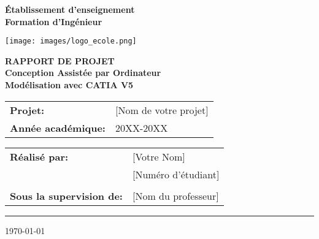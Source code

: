 
\begin{titlepage}
    \begin{center}
        \vspace*{1cm}
        
        \textbf{\LARGE{Établissement d'enseignement}} \\
        \vspace{0.5cm}
        \textbf{\Large{Formation d'Ingénieur}}
        
        \vspace{2cm}
        
        \texttt{[image: images/logo\_ecole.png]} %
        
        \vspace{2cm}
        
        \textbf{\Huge{RAPPORT DE PROJET}}\\
        \vspace{0.5cm}
        \textbf{\LARGE{Conception Assistée par Ordinateur}}\\
        \vspace{1cm}
        \textbf{\huge{Modélisation avec CATIA V5}}
        
        \vspace{1.5cm}
        
        \begin{tabular}{l l}
            \textbf{Projet:} & [Nom de votre projet] \\
            \textbf{Année académique:} & 20XX-20XX \\
        \end{tabular}
        
        \vfill
        
        \begin{tabular}{l l}
            \textbf{Réalisé par:} & [Votre Nom] \\
            & [Numéro d'étudiant] \\
            \\
            \textbf{Sous la supervision de:} & [Nom du professeur] \\
        \end{tabular}
        
        \vspace{1cm}
        
        \begin{center}
            \rule{0.5\textwidth}{0.5pt}
        \end{center}
        
        \vspace{0.5cm}
        
        {\Large{\today}}
        
    \end{center}
\end{titlepage}

%
% 
